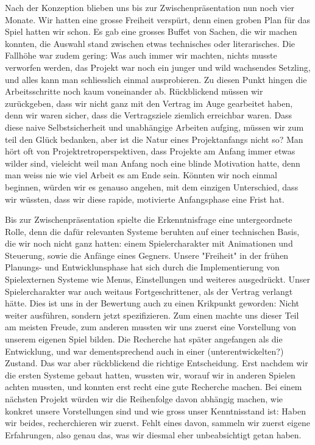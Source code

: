 \documentclass[../Main.tex]{subfiles}
\begin{document}
Nach der Konzeption blieben uns bis zur Zwischenpräsentation nun noch vier Monate. Wir hatten eine grosse Freiheit verspürt, denn einen groben Plan für das Spiel hatten wir schon. Es gab eine grosses Buffet von Sachen, die wir machen konnten, die Auswahl stand zwischen etwas technisches oder literarisches. Die Fallhöhe war zudem gering: Was auch immer wir machten, nichts musste verworfen werden, das Projekt war noch ein junger und wild wachsendes Setzling, und alles kann man schliesslich einmal ausprobieren. Zu diesen Punkt hingen die Arbeitsschritte noch kaum voneinander ab. Rückblickend müssen wir zurückgeben, dass wir nicht ganz mit den Vertrag im Auge gearbeitet haben, denn wir waren sicher, dass die Vertragsziele ziemlich erreichbar waren. Dass diese naive Selbstsicherheit und unabhängige Arbeiten aufging, müssen wir zum teil den Glück bedanken, aber ist die Natur eines Projektanfangs nicht so? Man hört oft von Projektretroperspektiven, dass Projekte am Anfang immer etwas wilder sind, vieleicht weil man Anfang noch eine blinde Motivation hatte, denn man weiss nie wie viel Arbeit es am Ende sein. Könnten wir noch einmal beginnen, würden wir es genauso angehen, mit dem einzigen Unterschied, dass wir wüssten, dass wir diese rapide, motivierte Anfangsphase eine Frist hat.

Bis zur Zwischenpräsentation spielte die Erkenntnisfrage eine untergeordnete Rolle, denn die dafür relevanten Systeme beruhten auf einer technischen Basis, die wir noch nicht ganz hatten: einem Spielercharakter mit Animationen und Steuerung, sowie die Anfänge eines Gegners. Unsere "Freiheit" in der frühen Planungs- und Entwicklunsphase hat sich durch die Implementierung von Spielexternen Systeme wie Menus, Einstellungen und weiteres ausgedrückt. Unser Spielercharakter war auch weitaus Fortgeschrittener, als der Vertrag verlangt hätte. Dies ist uns in der Bewertung auch zu einen Krikpunkt geworden: Nicht weiter ausführen, sondern jetzt spezifizieren. Zum einen machte uns dieser Teil am meisten Freude, zum anderen mussten wir uns zuerst eine Vorstellung von unserem eigenen Spiel bilden. Die Recherche hat später angefangen als die Entwicklung, und war dementsprechend auch in einer (unterentwickelten?) Zustand. Das war aber rückblickend die richtige Entscheidung. Erst nachdem wir die ersten Systeme gebaut hatten, wussten wir, worauf wir in anderen Spielen achten mussten, und konnten erst recht eine gute Recherche machen. Bei einem nächsten Projekt würden wir die Reihenfolge davon abhängig machen, wie konkret unsere Vorstellungen sind und wie gross unser Kenntnisstand ist: Haben wir beides, recherchieren wir zuerst. Fehlt eines davon, sammeln wir zuerst eigene Erfahrungen, also genau das, was wir diesmal eher unbeabsichtigt getan haben.
\end{document}
